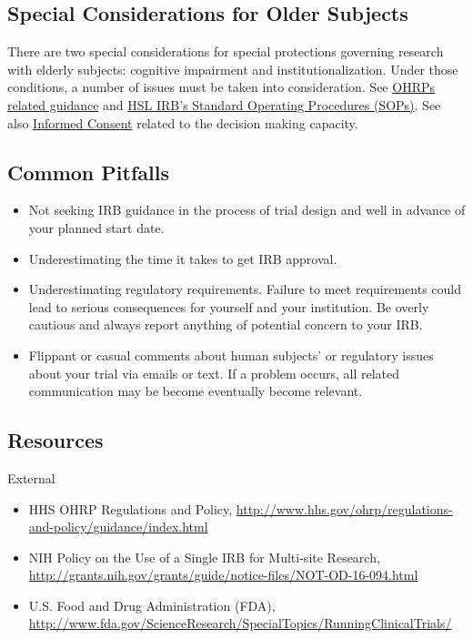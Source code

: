 \documentclass[]{book}
\providecommand{\tightlist}{%
  \setlength{\itemsep}{0pt}\setlength{\parskip}{0pt}}
\theoremstyle{definition}
\theoremstyle{definition}
\theoremstyle{definition}
\theoremstyle{remark}
\begin{document}
\subsection{Special Considerations for Older
Subjects}\label{special-considerations-for-older-subjects}

There are two special considerations for special protections governing
research with elderly subjects: cognitive impairment and
institutionalization. Under those conditions, a number of issues must be
taken into consideration. See
\href{http://archive.hhs.gov/ohrp/irb/irb_chapter6.htm}{OHRPs related
guidance} and
\href{http://thehslhub/~/media/HSLNet/Docs/IFAR/IRB/IRB_SOP.ashx}{HSL
IRB's Standard Operating Procedures (SOPs)}. See also
\href{https://ifar-isac.github.io/book/human-subject-protection-and-research-regulation.html\#informed-consent}{Informed
Consent} related to the decision making capacity.

\subsection{Common Pitfalls}\label{common-pitfalls-3}

\begin{itemize}
\tightlist
\item
  Not seeking IRB guidance in the process of trial design and well in
  advance of your planned start date.
\item
  Underestimating the time it takes to get IRB approval.
\item
  Underestimating regulatory requirements. Failure to meet requirements
  could lead to serious consequences for yourself and your institution.
  Be overly cautious and always report anything of potential concern to
  your IRB.
\item
  Flippant or casual comments about human subjects' or regulatory issues
  about your trial via emails or text. If a problem occurs, all related
  communication may be become eventually become relevant.
\end{itemize}

\subsection{Resources}\label{resources-4}

External

\begin{itemize}
\tightlist
\item
  HHS OHRP Regulations and Policy,
  \url{http://www.hhs.gov/ohrp/regulations-and-policy/guidance/index.html}
\item
  NIH Policy on the Use of a Single IRB for Multi-site Research,
  \url{http://grants.nih.gov/grants/guide/notice-files/NOT-OD-16-094.html}
\item
  U.S. Food and Drug Administration (FDA),
  \url{http://www.fda.gov/ScienceResearch/SpecialTopics/RunningClinicalTrials/}
\end{itemize}
\end{document}
